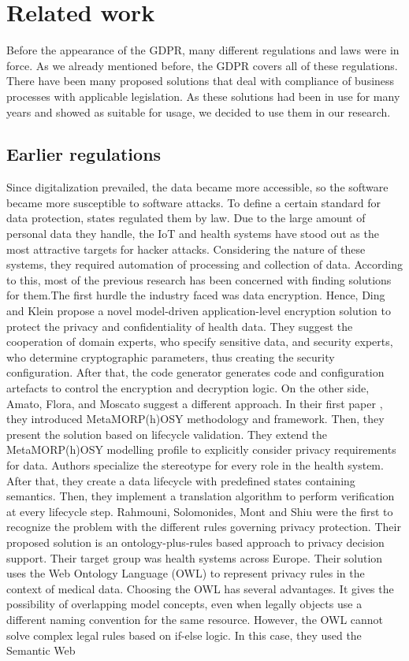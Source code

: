 \documentclass[11pt,english]{article}
\begin{document}
\section{Related work}
Before the appearance of the GDPR, many different regulations and laws were in force. As we already mentioned before, the GDPR covers all of these regulations.  There have been many proposed solutions that deal with compliance of business processes with applicable legislation. As these solutions had been in use for many years and showed as suitable for usage, we decided to use them in our research.
\subsection{Earlier regulations}
Since digitalization prevailed, the data became more accessible, so the software became more susceptible to software attacks. To define a certain standard for data protection, states regulated them by law. Due to the large amount of personal data they handle, the IoT \cite{iot} and health systems have stood out as the most attractive targets for hacker attacks. Considering the nature of these systems, they required automation of processing and collection of data.  According to this, most of the previous research has been concerned with finding solutions for them.\newline The first hurdle the industry faced was data encryption. Hence, Ding and Klein \cite{encryptionLevel} propose a novel model-driven application-level encryption solution to protect the privacy and confidentiality of health data. They suggest the cooperation of domain experts, who specify sensitive data, and security experts, who determine cryptographic parameters, thus creating the security configuration. After that, the code generator generates code and configuration artefacts to control the encryption and decryption logic. On the other side, Amato, Flora, and Moscato suggest a different approach. In their first paper \cite{6245777}, they introduced MetaMORP(h)OSY methodology and framework. Then, they present the solution \cite{amato2015model} based on lifecycle validation. They extend the MetaMORP(h)OSY modelling profile to explicitly consider privacy requirements for data. Authors specialize the stereotype for every role in the health system. After that, they create a data lifecycle with predefined states containing semantics. Then, they implement a translation algorithm to perform verification at every lifecycle step. \newline Rahmouni, Solomonides, Mont and Shiu \cite{rahmouni2011model} were the first to recognize the problem with the different rules governing privacy protection. Their proposed solution is an ontology-plus-rules based approach to privacy decision support. Their target group was health systems across Europe. Their solution uses the Web Ontology Language (OWL) \cite{owl} to represent privacy rules in the context of medical data. Choosing the OWL has several advantages. It gives the possibility of overlapping model concepts, even when legally objects use a different naming convention for the same resource. However, the OWL cannot solve complex legal rules based on if-else logic. In this case, they used the Semantic Web 
\end{document}
